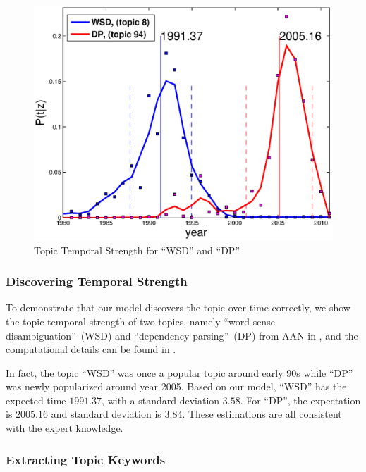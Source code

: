 \begin{figure}[h!]
  \begin{center}
    \includegraphics[scale= .5]{citation-lda/plot/aan_wsd_pd.eps}
  \end{center}
  \caption{Topic Temporal Strength for ``WSD'' and ``DP''}
  \label{fig::citation_aan_wsd_pd}
\end{figure}

\subsubsection{Discovering Temporal Strength}

To demonstrate that our model discovers the topic over time correctly, we show
the topic temporal strength of two topics, namely ``word sense
disambiguation''~(WSD) and ``dependency parsing''~(DP) from AAN in
, and the computational details can be found in
.

In fact, the topic ``WSD'' was once a popular topic around early 90s while
``DP'' was newly popularized around year 2005. Based on our model, ``WSD'' has
the expected time $1991.37$, with a standard deviation $3.58$. For ``DP'', the
expectation is $2005.16$ and standard deviation is $3.84$. These estimations are
all consistent with the expert knowledge.

\subsubsection{Extracting Topic Keywords}

